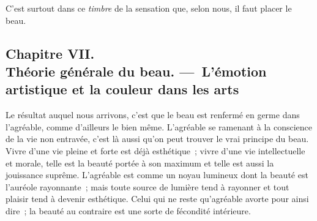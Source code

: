 \documentclass[french,twoside]{book} %
\begin{document}
C’est surtout dans ce \emph{timbre} de la sensation que, selon nous, il faut placer le beau.
\subsection[{Chapitre VII. Théorie générale du beau. — L’émotion artistique et la couleur dans les arts}]{Chapitre VII. \\
Théorie générale du beau. — L’émotion artistique et la couleur dans les arts}
\noindent  Le résultat auquel nous arrivons, c’est que le beau est renfermé en germe dans l’agréable, comme d’ailleurs le bien même. L’agréable se ramenant à la conscience de la vie non entravée, c’est là aussi qu’on peut trouver le vrai principe du beau. Vivre d’une vie pleine et forte est déjà esthétique ; vivre d’une vie intellectuelle et morale, telle est la beauté portée à son maximum et telle est aussi la jouissance suprême. L’agréable est comme un noyau lumineux dont la beauté est l’auréole rayonnante ; mais toute source de lumière tend à rayonner et tout plaisir tend à devenir esthétique. Celui qui ne reste qu’agréable avorte pour ainsi dire ; la beauté au contraire est une sorte de fécondité intérieure.\par
\end{document}
